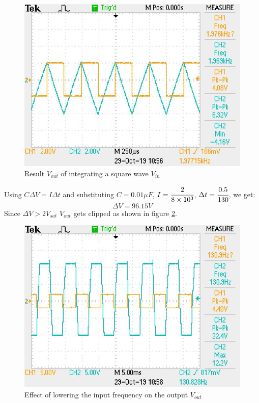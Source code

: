 \documentclass[12pt, titlepage]{article}
\theoremstyle{definition}
\begin{document}
    \begin{figure}[!h]
      \centering
      \includegraphics[scale=0.5]{images/results_q3.jpeg}
      \caption{Result \color{cyan}$V_{out}$ \color{black}of integrating a square wave \color{orange}$V_{in}$}
      \label{fig:results_q3}
    \end{figure}

    Using $ C\Delta V = I\Delta t$ and substituting $C=0.01\mu F$, $I=\cfrac{2}{8\times 10^3}$, $\Delta t = \cfrac{0.5}{130}$, we get:
    $$ \Delta V = 96.15 V$$
    Since $\Delta V > 2V_{sat}$ \text{, } $V_{out}$ gets clipped as shown in figure \ref{fig:results_q4}.

    \begin{figure}[!h]
      \centering
      \includegraphics[scale=0.5]{images/results_q4_2.jpeg}
      \caption{Effect of lowering the input frequency on the output \color{cyan}$V_{out}$}
      \label{fig:results_q4}
    \end{figure}
\end{document}
